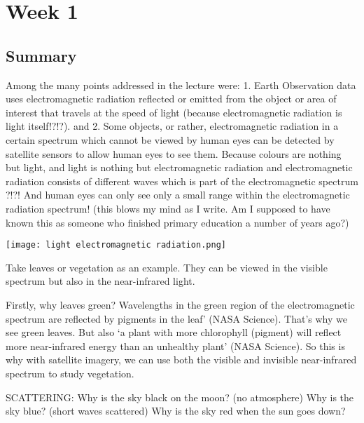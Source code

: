 \documentclass[
  letterpaper,
  DIV=11,
  numbers=noendperiod]{scrreprt}
\author{}
\date{}
\begin{document}
\ifdefined\Shaded\renewenvironment{Shaded}{\begin{tcolorbox}[frame hidden, borderline west={3pt}{0pt}{shadecolor}, enhanced, breakable, interior hidden, boxrule=0pt, sharp corners]}{\end{tcolorbox}}\fi

\hypertarget{week-1}{%
\chapter{Week 1}\label{week-1}}

\hypertarget{summary}{%
\section{Summary}\label{summary}}

Among the many points addressed in the lecture were: 1. Earth
Observation data uses electromagnetic radiation reflected or emitted
from the object or area of interest that travels at the speed of light
(because electromagnetic radiation is light itself!?!?). and 2. Some
objects, or rather, electromagnetic radiation in a certain spectrum
which cannot be viewed by human eyes can be detected by satellite
sensors to allow human eyes to see them. Because colours are nothing but
light, and light is nothing but electromagnetic radiation and
electromagnetic radiation consists of different waves which is part of
the electromagnetic spectrum ?!?! And human eyes can only see only a
small range within the electromagnetic radiation spectrum! (this blows
my mind as I write. Am I supposed to have known this as someone who
finished primary education a number of years ago?)

\texttt{[image: light electromagnetic radiation.png]}

Take leaves or vegetation as an example. They can be viewed in the
visible spectrum but also in the near-infrared light.

Firstly, why leaves green? Wavelengths in the green region of the
electromagnetic spectrum are reflected by pigments in the leaf' (NASA
Science). That's why we see green leaves. But also `a plant with more
chlorophyll (pigment) will reflect more near-infrared energy than an
unhealthy plant' (NASA Science). So this is why with satellite imagery,
we can use both the visible and invisible near-infrared spectrum to
study vegetation.

SCATTERING: Why is the sky black on the moon? (no atmosphere) Why is the
sky blue? (short waves scattered) Why is the sky red when the sun goes
down?
\end{document}
